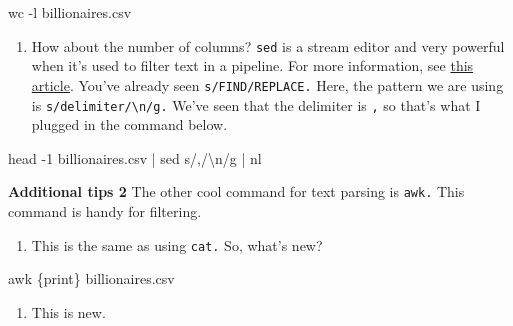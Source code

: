 \documentclass[
  letterpaper,
  DIV=11,
  numbers=noendperiod]{scrreprt}
\newenvironment{Shaded}{\begin{snugshade}}{\end{snugshade}}
\newcommand{\AttributeTok}[1]{\textcolor[rgb]{0.40,0.45,0.13}{#1}}
\newcommand{\FunctionTok}[1]{\textcolor[rgb]{0.28,0.35,0.67}{#1}}
\newcommand{\KeywordTok}[1]{\textcolor[rgb]{0.00,0.23,0.31}{#1}}
\newcommand{\NormalTok}[1]{\textcolor[rgb]{0.00,0.23,0.31}{#1}}
\newcommand{\StringTok}[1]{\textcolor[rgb]{0.13,0.47,0.30}{#1}}
\providecommand{\tightlist}{%
  \setlength{\itemsep}{0pt}\setlength{\parskip}{0pt}}\usepackage{longtable,booktabs,array}
\begin{document}
\begin{Shaded}
\begin{Highlighting}[]
\FunctionTok{wc} \AttributeTok{{-}l}\NormalTok{ billionaires.csv}
\end{Highlighting}
\end{Shaded}

\begin{enumerate}
\def\labelenumi{\arabic{enumi}.}
\setcounter{enumi}{3}
\tightlist
\item
  How about the number of columns? \texttt{sed} is a stream editor and
  very powerful when it's used to filter text in a pipeline. For more
  information, see
  \href{https://www.gnu.org/software/sed/manual/sed.html}{this article}.
  You've already seen \texttt{s/FIND/REPLACE.} Here, the pattern we are
  using is \texttt{s/delimiter/\textbackslash{}n/g.} We've seen that the
  delimiter is \texttt{,} so that's what I plugged in the command below.
\end{enumerate}

\begin{Shaded}
\begin{Highlighting}[]
\FunctionTok{head} \AttributeTok{{-}1}\NormalTok{ billionaires.csv }\KeywordTok{|} \FunctionTok{sed} \StringTok{\textquotesingle{}s/,/\textbackslash{}n/g\textquotesingle{}} \KeywordTok{|} \FunctionTok{nl}
\end{Highlighting}
\end{Shaded}

\textbf{Additional tips 2} The other cool command for text parsing is
\texttt{awk.} This command is handy for filtering.

\begin{enumerate}
\def\labelenumi{\arabic{enumi}.}
\tightlist
\item
  This is the same as using \texttt{cat.} So, what's new?
\end{enumerate}

\begin{Shaded}
\begin{Highlighting}[]
\FunctionTok{awk} \StringTok{\textquotesingle{}\{print\}\textquotesingle{}}\NormalTok{ billionaires.csv }
\end{Highlighting}
\end{Shaded}

\begin{enumerate}
\def\labelenumi{\arabic{enumi}.}
\setcounter{enumi}{1}
\tightlist
\item
  This is new.
\end{enumerate}
\end{document}
